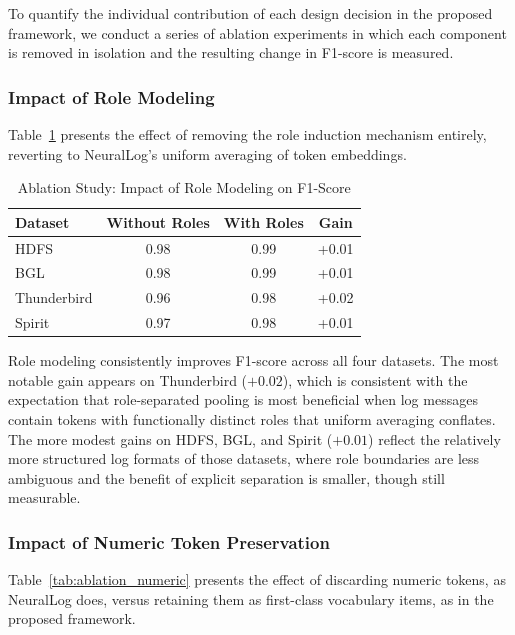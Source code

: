 To quantify the individual contribution of each design decision in the proposed framework, we conduct a series of ablation experiments in which each component is removed in isolation and the resulting change in F1-score is measured.

\subsubsection{Impact of Role Modeling}

Table~\ref{tab:ablation_roles} presents the effect of removing the role induction mechanism entirely, reverting to NeuralLog's uniform averaging of token embeddings.

\begin{table}[H]
\centering
\caption{Ablation Study: Impact of Role Modeling on F1-Score}
\label{tab:ablation_roles}
\begin{tabular}{@{}lccc@{}}
\toprule
\textbf{Dataset} & \textbf{Without Roles} & \textbf{With Roles} & \textbf{Gain} \\
\midrule
HDFS        & 0.98 & 0.99 & +0.01 \\
BGL         & 0.98 & 0.99 & +0.01 \\
Thunderbird & 0.96 & 0.98 & +0.02 \\
Spirit      & 0.97 & 0.98 & +0.01 \\
\bottomrule
\end{tabular}
\end{table}

Role modeling consistently improves F1-score across all four datasets. The most notable gain appears on Thunderbird ($+0.02$), which is consistent with the expectation that role-separated pooling is most beneficial when log messages contain tokens with functionally distinct roles that uniform averaging conflates. The more modest gains on HDFS, BGL, and Spirit ($+0.01$) reflect the relatively more structured log formats of those datasets, where role boundaries are less ambiguous and the benefit of explicit separation is smaller, though still measurable.

\subsubsection{Impact of Numeric Token Preservation}

Table~\ref{tab:ablation_numeric} presents the effect of discarding numeric tokens, as NeuralLog does, versus retaining them as first-class vocabulary items, as in the proposed framework.

